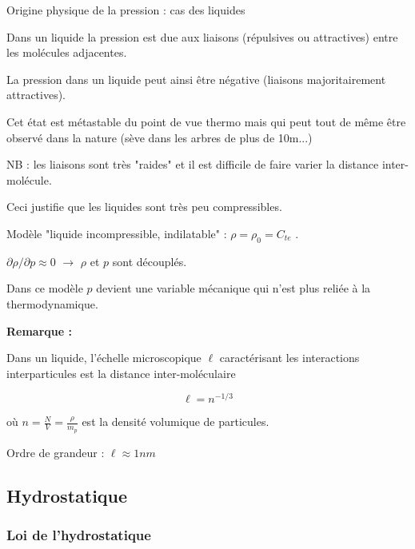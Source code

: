 \begin{frame} {Origine physique de la pression : cas des liquides}

\small 
Dans un liquide la pression est due aux liaisons (répulsives ou attractives) entre les molécules adjacentes.

\smallskip

La pression dans un liquide peut ainsi être négative (liaisons majoritairement attractives).

Cet état est métastable du point de vue thermo mais qui peut tout de même être observé dans la nature (sève dans les arbres de plus de 10m...)

\medskip

NB : les liaisons sont très "raides" et il est difficile de faire varier la distance inter-molécule.

Ceci justifie que les liquides sont très peu compressibles. 

\smallskip

Modèle "liquide incompressible, indilatable" : $\rho = \rho_0 = C_{te}$ . 

$\partial \rho / \partial p \approx 0 $ $\rightarrow$ $\rho$ et $p$ sont découplés.  

Dans ce modèle $p$ devient une variable mécanique qui n'est plus reliée à la thermodynamique.



\pause
\bigskip

{\bf Remarque :} 

Dans un liquide, l'échelle microscopique $\ell$ caractérisant les interactions interparticules est la distance inter-moléculaire

$$\ell  = n^{-1/3}  $$ 

où $n = \frac{N}{V} = \frac{\rho}{m_p}$ est la densité volumique de particules.

Ordre de grandeur :  $\ell \approx 1 nm $ 
 






\end{frame}

\subsection{Hydrostatique}

\subsubsection{Loi de l'hydrostatique}

